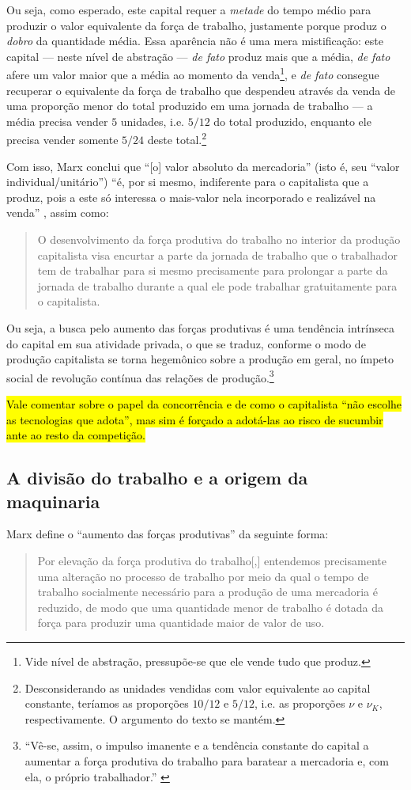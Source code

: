 Ou seja, como esperado, este capital requer a \textit{metade} do tempo médio para produzir o valor equivalente da força de trabalho, justamente porque produz o \textit{dobro} da quantidade média. Essa aparência não é uma mera mistificação: este capital --- neste nível de abstração --- \textit{de fato} produz mais que a média, \textit{de fato} afere um valor maior que a média ao momento da venda\footnote{Vide nível de abstração, pressupõe-se que ele vende tudo que produz.}, e \textit{de fato} consegue recuperar o equivalente da força de trabalho que despendeu através da venda de uma proporção menor do total produzido em uma jornada de trabalho --- a média precisa vender $5$ unidades, i.e. $5/12$ do total produzido, enquanto ele precisa vender somente $5/24$ deste total.\footnote{Desconsiderando as unidades vendidas com valor equivalente ao capital constante, teríamos as proporções $10/12$ e $5/12$, i.e. as proporções $\nu$ e $\nu_K$, respectivamente. O argumento do texto se mantém.} 

Com isso, Marx conclui que ``[o] valor absoluto da mercadoria'' (isto é, seu ``valor individual/unitário'') ``é, por si mesmo, indiferente para o capitalista que a produz, pois a este só interessa o mais-valor nela incorporado e realizável na venda'' \parencite[p. 394]{Marx2017}, assim como:
\begin{quote}
    O desenvolvimento da força produtiva do trabalho no interior da produção capitalista visa encurtar a parte da jornada de trabalho que o trabalhador tem de trabalhar para si mesmo precisamente para prolongar a parte da jornada de trabalho durante a qual ele pode trabalhar gratuitamente para o capitalista. \parencite[p. 395-6]{Marx2017}
\end{quote}

Ou seja, a busca pelo aumento das forças produtivas é uma tendência intrínseca do capital em sua atividade privada, o que se traduz, conforme o modo de produção capitalista se torna hegemônico sobre a produção em geral, no ímpeto social de revolução contínua das relações de produção.\footnote{``Vê-se, assim, o impulso imanente e a tendência constante do capital a aumentar a força produtiva do trabalho para baratear a mercadoria e, com ela, o próprio trabalhador.'' \parencite[p. 394]{Marx2017}} 

\hl{Vale comentar sobre o papel da concorrência e de como o capitalista ``não escolhe as tecnologias que adota'', mas sim é forçado a adotá-las ao risco de sucumbir ante ao resto da competição.}


\subsection{A divisão do trabalho e a origem da maquinaria}
Marx define o ``aumento das forças produtivas'' da seguinte forma:
\begin{quote}
    Por elevação da força produtiva do trabalho[,] entendemos precisamente uma alteração no processo de trabalho por meio da qual o tempo de trabalho socialmente necessário para a produção de uma mercadoria é reduzido, de modo que uma quantidade menor de trabalho é dotada da força para produzir uma quantidade maior de valor de uso. \parencite[p. 389]{Marx2017}
\end{quote}

